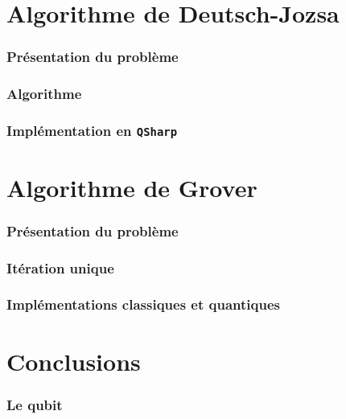 \documentclass{beamer}
\begin{document}
\section{Algorithme de Deutsch-Jozsa}

\begin{frame}
\frametitle{Présentation du problème}
\end{frame}

\begin{frame}
\frametitle{Algorithme}
\end{frame}

\begin{frame}
\frametitle{Implémentation en \texttt{QSharp}}
\end{frame}


\section{Algorithme de Grover}

\begin{frame}
\frametitle{Présentation du problème}
\end{frame}

\begin{frame}
\frametitle{Itération unique}
\end{frame}

\begin{frame}
\frametitle{Implémentations classiques et quantiques}
\end{frame}


\section{Conclusions}

\begin{frame}
\frametitle{Le qubit}
\end{frame}
\end{document}
